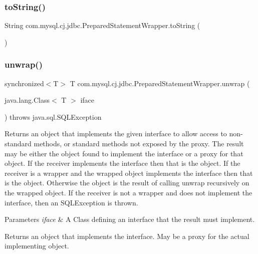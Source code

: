 \subsubsection{\texorpdfstring{to\+String()}{toString()}}
{\footnotesize\ttfamily String com.\+mysql.\+cj.\+jdbc.\+Prepared\+Statement\+Wrapper.\+to\+String (\begin{DoxyParamCaption}{ }\end{DoxyParamCaption})}

\mbox{\label{classcom_1_1mysql_1_1cj_1_1jdbc_1_1_prepared_statement_wrapper_aa3017e3af24221f89c4eac71808024c2}} 
\subsubsection{\texorpdfstring{unwrap()}{unwrap()}}
{\footnotesize\ttfamily synchronized$<$T$>$ T com.\+mysql.\+cj.\+jdbc.\+Prepared\+Statement\+Wrapper.\+unwrap (\begin{DoxyParamCaption}\item[{java.\+lang.\+Class$<$ T $>$}]{iface }\end{DoxyParamCaption}) throws java.\+sql.\+S\+Q\+L\+Exception}

Returns an object that implements the given interface to allow access to non-\/standard methods, or standard methods not exposed by the proxy. The result may be either the object found to implement the interface or a proxy for that object. If the receiver implements the interface then that is the object. If the receiver is a wrapper and the wrapped object implements the interface then that is the object. Otherwise the object is the result of calling {\ttfamily unwrap} recursively on the wrapped object. If the receiver is not a wrapper and does not implement the interface, then an {\ttfamily S\+Q\+L\+Exception} is thrown.


\begin{DoxyParams}{Parameters}
{\em iface} & A Class defining an interface that the result must implement. \\
\hline
\end{DoxyParams}
\begin{DoxyReturn}{Returns}
an object that implements the interface. May be a proxy for the actual implementing object. 
\end{DoxyReturn}

